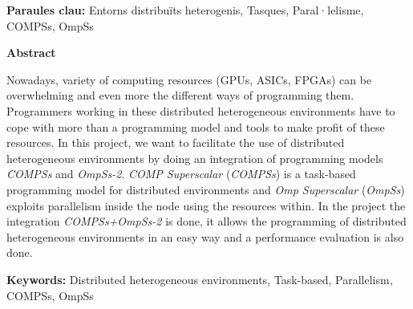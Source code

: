 \bigskip

\begin{centering}
	\textbf{Paraules clau:} Entorns distribuïts heterogenis, Tasques, Paral·lelisme, COMPSs, OmpSs
\end{centering}

\afterpage{\blankpage}
\newpage

\noindent
\thispagestyle{plain}
\begin{center}
	\huge{\textbf{Abstract}}
\end{center}

Nowadays, variety of computing resources (GPUs, ASICs, FPGAs) can be overwhelming and even more the different ways of programming them. Programmers working in these  distributed heterogeneous environments have to cope with more than a programming model and tools to make profit of these resources. In this project, we want to facilitate the use of distributed heterogeneous environments by doing an integration of programming models \textit{COMPSs} and \textit{OmpSs-2}. \textit{COMP Superscalar} (\textit{COMPSs}) is a task-based programming model for distributed environments and \textit{Omp Superscalar} (\textit{OmpSs}) exploits parallelism inside the node using the resources within. In the project the integration \textit{COMPSs+OmpSs-2} is done, it allows the programming of distributed heterogeneous environments in an easy way and a performance evaluation is also done.

\bigskip

\begin{centering}
	\textbf{Keywords:} Distributed heterogeneous environments, Task-based, Parallelism, COMPSs, OmpSs
\end{centering}